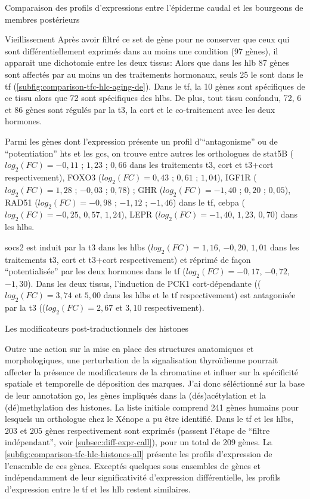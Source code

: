 \documentclass[../main.tex]{subfiles}
\begin{document}
\begin{chapter}{Comparaison des profils d'expressions entre l'épiderme caudal et les bourgeons de membres postérieurs}
\begin{section}{Vieillissement}
Après avoir filtré ce set de gène pour ne conserver que ceux qui sont différentiellement exprimés dans au moins une condition (97 gènes), il apparait une dichotomie entre les deux tissus:
Alors que dans les \gls{hlb} 87 gènes sont affectés par au moins un des traitements hormonaux, seuls 25 le sont dans le \gls{tf} (\autoref{subfig:comparison-tfc-hlc-aging-de}).
Dans le \gls{tf}, la 10 gènes sont spécifiques de ce tissu alors que 72 sont spécifiques des \glspl{hlb}. 
De plus, tout tissu confondu, 72, 6 et 86 gènes sont régulés par la \gls{t3}, la \gls{cort} et le co-traitement avec les deux hormones.
\par
Parmi les gènes dont l'expression présente un profil d'``antagonisme'' ou de ``potentiation'' \glspl{ht} et les \glspl{gc}, on trouve entre autres les orthologues de \gls{stat5}B ($log_2(FC)=-0,11$ ; $1,23$ ; $0,66$ dans les traitements \gls{t3}, \gls{cort} et \gls{t3}+\gls{cort} respectivement), FOXO3 ($log_2(FC)=0,43$ ; $0,61$ ; $1,04$), IGF1R ($log_2(FC)=1,28$ ; $-0,03$ ; $0,78$) ; GHR ($log_2(FC)=-1,40$ ; $0,20$ ; $0,05$), RAD51 ($log_2(FC)=-0,98$ ; $-1,12$ ; $-1,46$) dans le \gls{tf}, \gls{cebpa} ($log_2(FC)=-0,25$, $0,57$, $1,24$), LEPR ($log_2(FC)=-1,40$, $1,23$, $0,70$) dans les \glspl{hlb}.
\par
\gls{socs2} est induit par la \gls{t3} dans les \glspl{hlb} ($log_2(FC)=1,16$, $-0,20$, $1,01$ dans les traitements \gls{t3}, \gls{cort} et \gls{t3}+\gls{cort} respectivement) et réprimé de façon ``potentialisée'' par les deux hormones dans le \gls{tf} ($log_2(FC)=-0,17$, $-0,72$, $-1,30$).
Dans les deux tissus, l'induction de PCK1 \gls{cort}-dépendante (($log_2(FC)=3,74$ et $5,00$ dans les \glspl{hlb} et le \gls{tf} respectivement) est antagonisée par la \gls{t3} (($log_2(FC)=2,67$ et $3,10$ respectivement).

\end{section}


\begin{section}{Les modificateurs post-traductionnels des histones}\label{sec:res-histones}

Outre une action sur la mise en place des structures anatomiques et morphologiques, une perturbation de la signalisation thyroïdienne pourrait affecter la présence de modificateurs de la chromatine et influer sur la spécificité spatiale et temporelle de déposition des marques.
J'ai donc séléctionné sur la base de leur annotation \gls{go}, les gènes impliqués dans la (dés)acétylation et la (dé)methylation des histones.
La liste initiale comprend 241 gènes humains pour lesquels un orthologue chez le Xénope a pu être identifié.
Dans le \gls{tf} et les \glspl{hlb}, 203 et 205 gènes respectivement sont exprimés (passent l'étape de ``filtre indépendant'', voir \autoref{subsec:diff-expr-call}), pour un total de 209 gènes.
La \autoref{subfig:comparison-tfc-hlc-histones-all} présente les profils d'expression de l'ensemble de ces gènes.
Exceptés quelques sous ensembles de gènes et indépendamment de leur significativité d'expression différentielle, les profils d'expression entre le \gls{tf} et les \gls{hlb} restent similaires.


\end{section}
\end{chapter}
\end{document}
